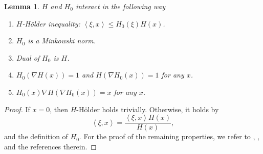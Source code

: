 \documentclass[11pt]{amsart}
\newtheorem{lemma}[theorem]{Lemma}
\newcommand{\D}{\nabla}
\numberwithin{equation}{section}
\begin{document}
\begin{lemma}\label{H0} $H$ and $H_{0}$ interact in the following way
    \begin{enumerate}
     \item $H$-H\"older inequality: $\left<\xi, x\right>\leq H_{0}\left(\xi\right)H\left(x\right)$.
     \item $H_{0}$ is a Minkowski norm.
        \item Dual of $H_{0}$ is $H$.
        \item $H_{0}\left(\D H(x)\right)=1$ and $H\left(\D H_{0}(x)\right)=1$ for any $x$.
        \item $H_{0}(x)\nabla H(\nabla H_{0}(x))=x$ for any $x$.
    \end{enumerate}
\end{lemma}
\begin{proof}
    If $x=0$, then $H$-H\"older holds trivially. Otherwise, it holds by 
    \begin{equation*}
        \left<\xi, x\right>=\frac{\left<\xi , x\right>H\left(x\right)}{H\left(x\right)},
    \end{equation*}
    and the definition of $H_{0}$.
    For the proof of the remaining properties, we refer to \cite[Proposition 1.3]{DissertationXia}, \cite[Section 2.1]{BePo1996}, and the references therein.
\end{proof}
\end{document}
